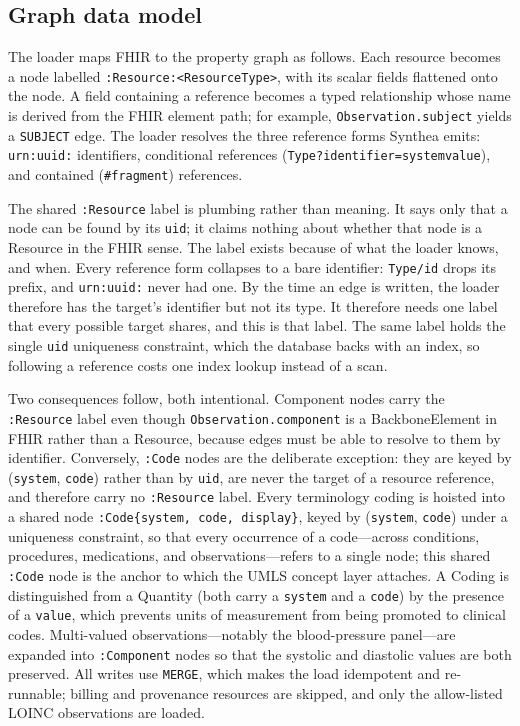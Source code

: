 \subsection{Graph data model}
The loader maps FHIR to the property graph as follows. Each resource becomes a node labelled
\texttt{:Resource:<ResourceType>}, with its scalar fields flattened onto the node. A field
containing a reference becomes a typed relationship whose name is derived from the FHIR
element path; for example, \texttt{Observation.subject} yields a \texttt{SUBJECT} edge. The
loader resolves the three reference forms Synthea emits: \texttt{urn:uuid:} identifiers,
conditional references (\texttt{Type?identifier=system\textbar value}), and contained
(\texttt{\#fragment}) references.

The shared \texttt{:Resource} label is plumbing rather than meaning. It says only
that a node can be found by its \texttt{uid}; it claims nothing about whether that node is a
Resource in the FHIR sense. The label exists because of what the loader knows, and when.
Every reference form collapses to a bare identifier: \texttt{Type/id} drops its prefix, and
\texttt{urn:uuid:} never had one. By the time an edge is written, the loader therefore has
the target's identifier but not its type. It therefore needs one label that every possible target
shares, and this is that label. The same label holds the single \texttt{uid} uniqueness
constraint, which the database backs with an index, so following a reference costs one index
lookup instead of a scan.

Two consequences follow, both intentional. Component nodes carry the \texttt{:Resource}
label even though \texttt{Observation.component} is a BackboneElement in FHIR rather than a
Resource, because edges must be able to resolve to them by identifier. Conversely,
\texttt{:Code} nodes are the deliberate exception: they are keyed by
(\texttt{system}, \texttt{code}) rather than by \texttt{uid}, are never the target of a
resource reference, and therefore carry no \texttt{:Resource} label. Every terminology coding is hoisted into a shared node
\texttt{:Code\{system, code, display\}}, keyed by (\texttt{system}, \texttt{code}) under a
uniqueness constraint, so that every occurrence of a code---across conditions, procedures,
medications, and observations---refers to a single node; this shared \texttt{:Code} node is
the anchor to which the UMLS concept layer attaches. A Coding is distinguished from a
Quantity (both carry a \texttt{system} and a \texttt{code}) by the presence of a
\texttt{value}, which prevents units of measurement from being promoted to clinical codes.
Multi-valued observations---notably the blood-pressure panel---are expanded into
\texttt{:Component} nodes so that the systolic and diastolic values are both preserved. All
writes use \texttt{MERGE}, which makes the load idempotent and re-runnable; billing and
provenance resources are skipped, and only the allow-listed LOINC observations are loaded.


